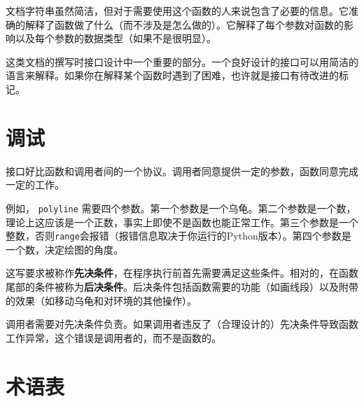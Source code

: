 
文档字符串虽然简洁，但对于需要使用这个函数的人来说包含了必要的信息。它准确的解释了函数做了什么（而不涉及是怎么做的）。它解释了每个参数对函数的影响以及每个参数的数据类型（如果不是很明显）。

这类文档的撰写时接口设计中一个重要的部分。一个良好设计的接口可以用简洁的语言来解释。如果你在解释某个函数时遇到了困难，也许就是接口有待改进的标记。


\section{调试}

接口好比函数和调用者间的一个协议。调用者同意提供一定的参数，函数同意完成一定的工作。

例如， {\tt polyline} 需要四个参数。第一个参数是一个乌龟。第二个参数是一个数，理论上这应该是一个正数，事实上即使不是函数也能正常工作。第三个参数是一个整数，否则{\tt range}会报错（报错信息取决于你运行的Python版本）。第四个参数是一个数，决定绘图的角度。

这写要求被称作{\bf 先决条件}，在程序执行前首先需要满足这些条件。相对的，在函数尾部的条件被称为{\bf 后决条件}。后决条件包括函数需要的功能（如画线段）以及附带的效果（如移动乌龟和对环境的其他操作）。


调用者需要对先决条件负责。如果调用者违反了（合理设计的）先决条件导致函数工作异常，这个错误是调用者的，而不是函数的。



\section{术语表}

